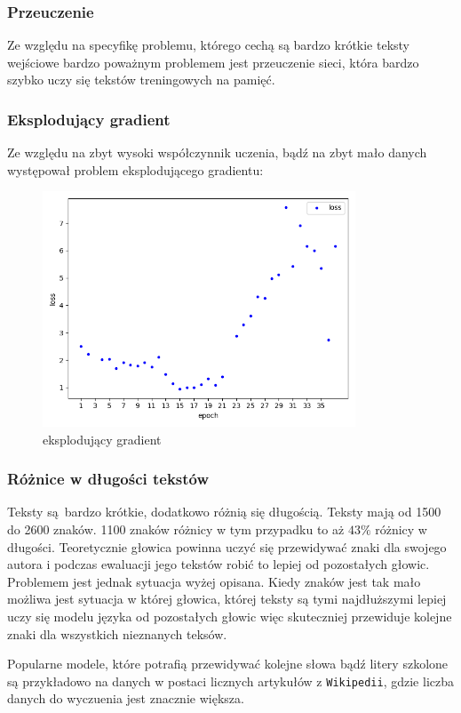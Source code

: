 \subsubsection{Przeuczenie}
Ze względu na specyfikę problemu, którego cechą są bardzo krótkie teksty wejściowe bardzo poważnym 
problemem jest przeuczenie sieci, która
bardzo szybko uczy się tekstów treningowych na pamięć. 

\subsubsection{Eksplodujący gradient}
Ze względu na zbyt wysoki współczynnik uczenia, bądź na zbyt mało danych występował problem eksplodującego
gradientu:
\begin{figure}[H]
	\centering
	\includegraphics[height=7cm]{./images/exploading_gradient.png}
	\caption{eksplodujący gradient}
	\label{fig:test5}
	\end{figure}

\subsubsection{Różnice w długości tekstów}
Teksty są bardzo krótkie, dodatkowo różnią się długością. Teksty mają od 1500 do 2600 znaków. 1100 znaków 
różnicy w tym przypadku to aż $43\%$ różnicy w długości. Teoretycznie głowica powinna uczyć się przewidywać znaki dla 
swojego autora i podczas ewaluacji jego tekstów robić to lepiej od pozostałych głowic. Problemem jest
 jednak sytuacja wyżej opisana. Kiedy znaków jest tak mało 
możliwa jest sytuacja w której głowica, której teksty są tymi najdłuższymi lepiej uczy się modelu języka od
pozostałych głowic więc skuteczniej przewiduje kolejne znaki dla wszystkich nieznanych teksów.

Popularne modele, które potrafią przewidywać kolejne słowa bądź litery szkolone są przykładowo na danych w postaci licznych 
artykułów z \texttt{Wikipedii}, gdzie liczba danych do wyczuenia jest znacznie większa.

